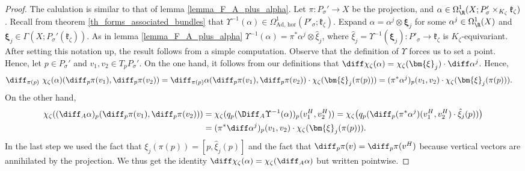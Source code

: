 {
\begin{proof}
    The calulation is similar to that of lemma \ref{lemma_F_A_plus_alpha}. Let \(\pi\colon P_\sigma'\to X\) be the projection, and \(\alpha \in \Omega_\R^1(X; P_\sigma' \times_{K_\zeta} \mathfrak{k}_\zeta)\). Recall from theorem \ref{th_forms_associated_bundles} that \(\Upsilon^{-1}(\alpha) \in \Omega^1_{\text{Ad, hor}}(P'_\sigma; \mathfrak{k}_\zeta)\). Expand \(\alpha=\alpha^j \otimes \bm{\xi}_j\) for some \(\alpha^j \in \Omega_\R^1(X)\) and \(\bm{\xi}_j\in \Gamma(X; P_\sigma'(\mathfrak{k}_\zeta))\). As in lemma \ref{lemma_F_A_plus_alpha} \(\Upsilon^{-1}(\alpha)=\pi^* \alpha^j \otimes \hat{\xi}_j\), where \(\hat{\xi}_j=\Upsilon^{-1}(\bm{\xi}_j)\colon P'_\sigma \to \mathfrak{k}_\zeta\) is \(K_\zeta\)-equivariant. After setting this notation up, the result follows from a simple computation. Observe that the definition of \(\Upsilon\) forces us to set a point. Hence, let \(p \in P_\sigma'\) and \(v_1, v_2 \in T_pP_\sigma'\). On the one hand, it follows from our definitions that \(\diff \chi_\zeta(\alpha)=\chi_\zeta(\bm{\xi}_j)\cdot\diff \alpha^j\). Hence, 
    \begin{align*}
        \diff_{\pi(p)}\ \chi_\zeta(\alpha) (\diff_p \pi(v_1), \diff_p\pi(v_2)) & = \diff_{\pi(p)} \alpha(\diff_p\pi(v_1), \diff_p\pi(v_2)) \cdot \chi_\zeta(\bm{\xi}_j(\pi(p)))=(\pi^*\alpha^j)_p(v_1, v_2) \cdot \chi_\zeta(\bm{\xi}_j(\pi(p))).
    \end{align*} 
    On the other hand,
    \begin{align*}
        \chi_\zeta((\diff_A \alpha)_p(\diff_p\pi(v_1), \diff_p\pi(v_2))) & = \chi_\zeta(q_p( \Diff_A \Upsilon^{-1}(\alpha))_p(v_1^H, v_2^H)) = \chi_\zeta\big(q_p(\diff_p(\pi^* \alpha^j)(v_1^H,v_2^H)\cdot \hat{\xi}_j(p))\big) \\
        & = (\pi^* \diff\alpha^j)_p(v_1, v_2) \cdot \chi_\zeta(\bm{\xi}_j(\pi(p))).
    \end{align*}
    In the last step we used the fact that \(\xi_j(\pi(p))=[p, \hat{\xi}_j(p)]\) and the fact that \(\diff_p\pi(v)=\diff_p\pi(v^H)\) because vertical vectors are annihilated by the projection. We thus get the identity \(\diff \chi_\zeta(\alpha)=\chi_\zeta(\diff_A \alpha)\) but written pointwise.
\end{proof}

}
